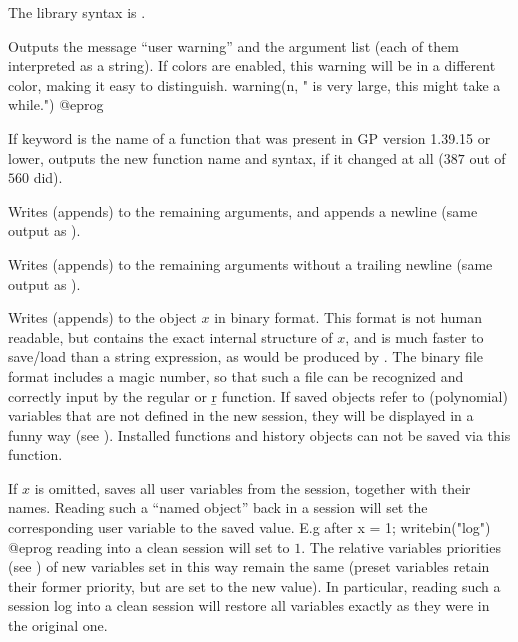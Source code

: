 {The library syntax is .

\label{se:warning}
Outputs the message ``user warning''
and the argument list (each of them interpreted as a string).
If colors are enabled, this warning will be in a different color,
making it easy to distinguish.
\bprog
warning(n, " is very large, this might take a while.")
@eprog

\label{se:whatnow}
If keyword  is the name of a function that was present in GP
version 1.39.15 or lower, outputs the new function name and syntax, if it
changed at all ($387$ out of $560$ did).

\label{se:write}
Writes (appends) to  the remaining arguments, and appends a
newline (same output as ).

\label{se:write1}
Writes (appends) to  the remaining arguments without a
trailing newline (same output as ).

\label{se:writebin}
Writes (appends) to
 the object $x$ in binary format. This format is not human
readable, but contains the exact internal structure of $x$, and is much
faster to save/load than a string expression, as would be produced by
. The binary file format includes a magic number, so that such a
file can be recognized and correctly input by the regular  or \b{r}
function. If saved objects refer to (polynomial) variables that are not
defined in the new session, they will be displayed in a funny way (see
). Installed functions and history objects can not be saved
via this function.

If $x$ is omitted, saves all user variables from the session, together with
their names. Reading such a ``named object'' back in a  session will set
the corresponding user variable to the saved value. E.g after
\bprog
x = 1; writebin("log")
@eprog\noindent
reading  into a clean session will set  to $1$.
The relative variables priorities (see ) of new variables
set in this way remain the same (preset variables retain their former
priority, but are set to the new value). In particular, reading such a
session log into a clean session will restore all variables exactly as they
were in the original one.

}
